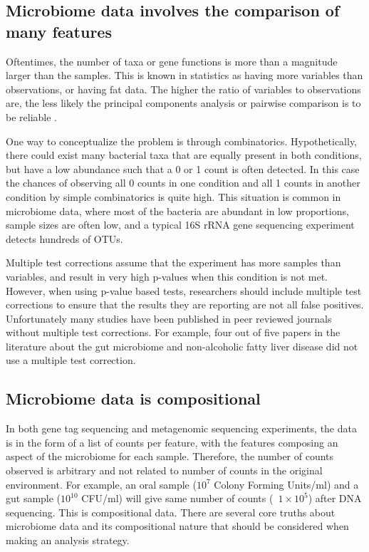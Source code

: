 \subsection{Microbiome data involves the comparison of many features}
Oftentimes, the number of taxa or gene functions is more than a magnitude larger than the samples. This is known in statistics as having more variables than observations, or having fat data. The higher the ratio of variables to observations are, the less likely the principal components analysis or pairwise comparison is to be reliable \cite{osborne2004sample}.

One way to conceptualize the problem is through combinatorics. Hypothetically, there could exist many bacterial taxa that are equally present in both conditions, but have a low abundance such that a 0 or 1 count is often detected. In this case the chances of observing all 0 counts in one condition and all 1 counts in another condition by simple combinatorics is quite high. This situation is common in microbiome data, where most of the bacteria are abundant in low proportions, sample sizes are often low, and a typical 16S rRNA gene sequencing experiment detects hundreds of OTUs.

Multiple test corrections assume that the experiment has more samples than variables, and result in very high p-values when this condition is not met. However, when using p-value based tests, researchers should include multiple test corrections to ensure that the results they are reporting are not all false positives. Unfortunately many studies have been published in peer reviewed journals without multiple test corrections. For example, four out of five papers in the literature about the gut microbiome and non-alcoholic fatty liver disease did not use a multiple test correction.

\subsection{Microbiome data is compositional}
In both gene tag sequencing and metagenomic sequencing experiments, the data is in the form of a list of counts per feature, with the features composing an aspect of the microbiome for each sample. Therefore, the number of counts observed is arbitrary and not related to number of counts in the original environment. For example, an oral sample ($10^{7}$ Colony Forming Units/ml) and a gut sample ($10^{10}$ CFU/ml) will give same number of counts (~$1 \times 10^{5}$) after DNA sequencing. This is compositional data. There are several core truths about microbiome data and its compositional nature that should be considered when making an analysis strategy.

